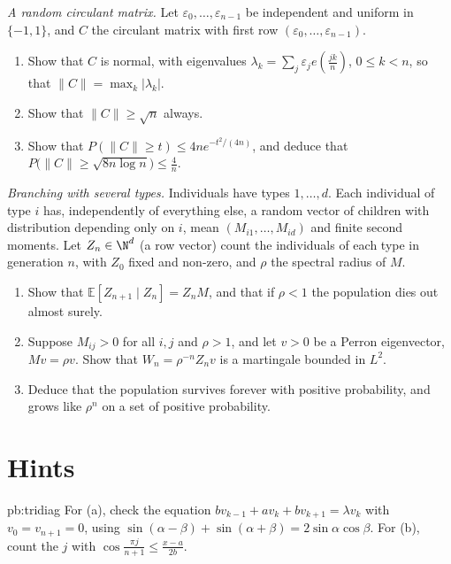 \begin{exercise}[$\star\star$]\label{pb:randomcirculant}
\emph{A random circulant matrix.} Let $\varepsilon_0,\dots,\varepsilon_{n-1}$ be independent and uniform in $\{-1,1\}$, and $C$ the circulant matrix with first row $(\varepsilon_0,\dots,\varepsilon_{n-1})$.
\begin{enumerate}[label=(\alph*)]
\item Show that $C$ is normal, with eigenvalues $\lambda_k=\sum_j\varepsilon_je(\frac{jk}n)$, $0\le k<n$, so that $\|C\|=\max_k|\lambda_k|$.
\item Show that $\|C\|\ge\sqrt n$ always.
\item Show that $P(\|C\|\ge t)\le4ne^{-t^2/(4n)}$, and deduce that $P\bigl(\|C\|\ge\sqrt{8n\log n}\bigr)\le\frac4n$.
\end{enumerate}
\end{exercise}

\begin{exercise}[$\star\star\star$]\label{pb:multitype}
\emph{Branching with several types.} Individuals have types $1,\dots,d$. Each individual of type $i$ has, independently of everything else, a random vector of children with
distribution depending only on $i$, mean $(M_{i1},\dots,M_{id})$ and finite second moments. Let $Z_n\in\N^d$ (a row vector) count the individuals of each type in generation $n$, with $Z_0$ fixed and
non-zero, and $\rho$ the spectral radius of $M$.
\begin{enumerate}[label=(\alph*)]
\item Show that $\mathbb E[Z_{n+1}\mid Z_n]=Z_nM$, and that if $\rho<1$ the population dies out almost surely.
\item Suppose $M_{ij}>0$ for all $i,j$ and $\rho>1$, and let $v>0$ be a Perron eigenvector, $Mv=\rho v$. Show that $W_n=\rho^{-n}Z_nv$ is a martingale bounded in $L^2$.
\item Deduce that the population survives forever with positive probability, and grows like $\rho^n$ on a set of positive probability.
\end{enumerate}
\end{exercise}

\section*{Hints}

\begin{hint}{pb:tridiag}
For (a), check the equation $bv_{k-1}+av_k+bv_{k+1}=\lambda v_k$ with $v_0=v_{n+1}=0$, using $\sin(\alpha-\beta)+\sin(\alpha+\beta)=2\sin\alpha\cos\beta$. For (b), count the $j$ with
$\cos\frac{\pi j}{n+1}\le\frac{x-a}{2b}$.
\end{hint}

